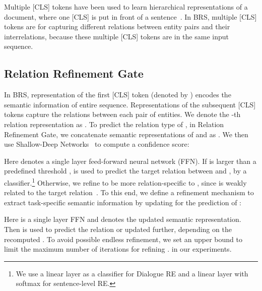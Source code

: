 \documentclass{article}
\begin{document}
Multiple [CLS] tokens have been used to learn hierarchical representations of a document, where one [CLS] is put in front of a sentence~\cite{liu2019fine,chen-etal-2019-group}. In BRS, multiple [CLS] tokens are for capturing different relations between entity pairs and their interrelations, because these multiple [CLS] tokens are in the same input sequence. 

\subsection{Relation Refinement Gate}
In BRS, representation of the first [CLS] token (denoted by ) encodes the semantic information of entire sequence. Representations of the subsequent [CLS] tokens capture the relations between each pair of entities. We denote the -th relation representation as . To predict the relation type of , in Relation Refinement Gate, we concatenate semantic representations of  and  as . We then use Shallow-Deep Networks~\cite{kaya2019shallow} to compute a confidence score:

Here  denotes a single layer feed-forward neural network (FFN). If  is larger than a predefined threshold ,  is used to predict the target relation between  and , by a classifier.\footnote{We use a linear layer as a classifier for Dialogue RE and a linear layer with softmax for sentence-level RE.} Otherwise, we refine  to be more relation-specific to , since  is weakly related to the target relation~\cite{xue2020gdpnet}. To this end, we define a refinement mechanism to extract task-specific semantic information by updating  for the prediction of :

Here  is a single layer FFN and  denotes the updated semantic representation. Then  is used to predict the relation or updated further, depending on the recomputed . To avoid possible endless refinement, we set an upper bound  to limit the maximum number of iterations for refining .  in our experiments.
\end{document}
